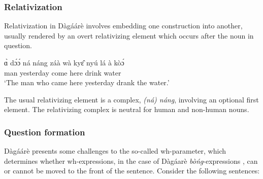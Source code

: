 \begin{refsection}
\subsubsection{ Relativization}
Relativization in Dàgáárè involves embedding one construction into another, usually
rendered by an overt relativizing element which occurs after the noun in question.

\ea \gll ɑ̀ dɔ́ɔ́ ná náng záà wà kyɛ̂ nyú lá à kòɔ́\\
{\DEF} man {\REL} {\REL} yesterday come here drink {\FOC} {\DEF} water\\
\glt ‘The man who came here yesterday drank the water.’\z 

The usual relativizing element is a complex, \textit{(ná) náng}, involving an optional first element.
The relativizing complex is neutral for human and non-human nouns.

\subsubsection{Question formation}
Dàgáárè presents some challenges to the so-called wh-parameter, which determines
whether wh-expressions, in the case of Dàgáarè \textit{bòńg}-expressions \citet{Bodomo1997}, can or
cannot be moved to the front of the sentence. Consider the following sentences:


\ea {}
\z\z

\ea {}
\z\z 

\ea {}
\z\z


\end{refsection}
